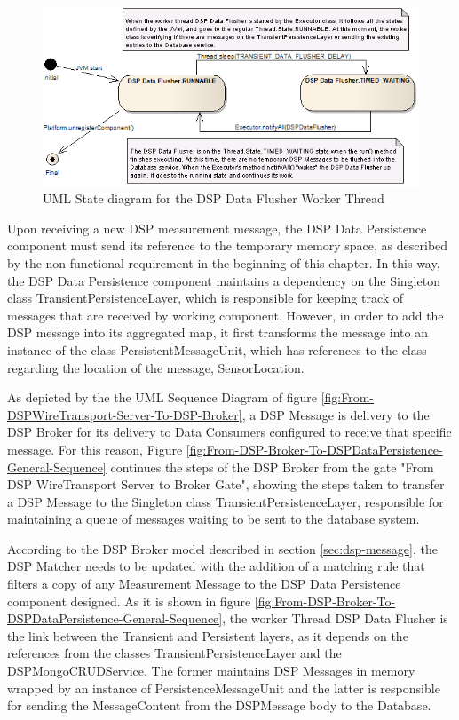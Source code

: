 \begin{figure}[!b]
  \centering
  \includegraphics[scale=0.5]{../diagrams/DSP-DataPersistence-Flusher-State-Diagram}
  \caption{UML State diagram for the DSP Data Flusher Worker Thread}
  \label{fig:DSP-DataPersistence-Flusher-State-Diagram}
\end{figure}

Upon receiving a new DSP measurement message, the DSP Data Persistence
component must send its reference to the temporary memory space, as described
by the non-functional requirement in the beginning of this chapter. In this
way, the DSP Data Persistence component maintains a dependency on the Singleton
class TransientPersistenceLayer, which is responsible for keeping track of
messages that are received by working component. However, in order to add the
DSP message into its aggregated map, it first transforms the message into an
instance of the class PersistentMessageUnit, which has references to the class
regarding the location of the message, SensorLocation.

As depicted by the the UML Sequence Diagram \cite{uml} of figure
\ref{fig:From-DSPWireTransport-Server-To-DSP-Broker}, a DSP Message
is delivery to the DSP Broker for its delivery to Data Consumers configured to
receive that specific message. For this reason, Figure
\ref{fig:From-DSP-Broker-To-DSPDataPersistence-General-Sequence} continues the
steps of the DSP Broker from the gate "From DSP WireTransport Server to Broker
Gate", showing the steps taken to transfer a DSP Message to the Singleton
class TransientPersistenceLayer, responsible for maintaining a queue of
messages waiting to be sent to the database system.

According to the DSP Broker model described in section \ref{sec:dsp-message}, 
the DSP Matcher needs to be updated with the addition of a matching rule that
filters a copy of any Measurement Message to the DSP Data Persistence component
designed. As it is shown in figure
\ref{fig:From-DSP-Broker-To-DSPDataPersistence-General-Sequence}, the worker
Thread DSP Data Flusher is the link between the Transient and Persistent
layers, as it depends on the references from the classes
TransientPersistenceLayer and the DSPMongoCRUDService. The former maintains
DSP Messages in memory wrapped by an instance of PersistenceMessageUnit and
the latter is responsible for sending the MessageContent from the DSPMessage
body to the Database.

